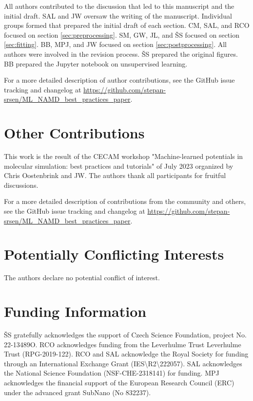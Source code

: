 \documentclass[9pt,bestpractices]{livecoms}
\newcommand{\githubrepository}{\url{https://github.com/stepan-srsen/ML_NAMD_best_practices_paper}}  %
\begin{document}
All authors contributed to the discussion that led to this manuscript and the initial draft. SAL and JW oversaw the writing of the manuscript. Individual groups formed that prepared the initial draft of each section. CM, SAL, and RCO focused on section \ref{sec:preprocessing}. SM, GW, JL, and ŠS focused on section \ref{sec:fitting}. BB, MPJ, and JW focused on section \ref{sec:postprocessing}. All authors were involved in the revision process. ŠS prepared the original figures. BB prepared the Jupyter notebook on unsupervised learning.

For a more detailed description of author contributions,
see the GitHub issue tracking and changelog at \githubrepository.

\section*{Other Contributions}
%

This work is the result of the CECAM workshop "Machine-learned potentials in molecular simulation: best practices and tutorials" of July 2023 organized by Chris Oostenbrink and JW. 
The authors thank all participants for fruitful discussions. 

For a more detailed description of contributions from the community and others, see the GitHub issue tracking and changelog at \githubrepository.

\section*{Potentially Conflicting Interests}

The authors declare no potential conflict of interest.

\section*{Funding Information}
ŠS gratefully acknowledges the support of Czech Science Foundation, project No. 22-13489O. RCO acknowledges funding from the Leverhulme Trust Leverhulme Trust (RPG-2019-122). RCO and SAL acknowledge the Royal Society for funding through an International Exchange Grant (IES\textbackslash R2\textbackslash 222057). SAL acknowledges the National Science Foundation (NSF-CHE-2318141) for funding. MPJ acknowledges the financial support of the European Research Council (ERC) under the advanced grant SubNano (No 832237).
\end{document}
